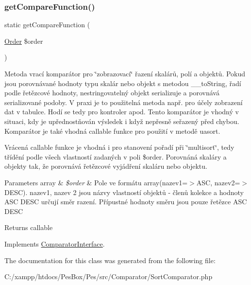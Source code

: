 \subsubsection{\texorpdfstring{get\+Compare\+Function()}{getCompareFunction()}}
{\footnotesize\ttfamily static get\+Compare\+Function (\begin{DoxyParamCaption}\item[{\mbox{\hyperlink{class_pes_1_1_query_1_1_order}{Order}}}]{\$order }\end{DoxyParamCaption})\hspace{0.3cm}{\ttfamily [static]}}

Metoda vrací komparátor pro \char`\"{}zobrazovací\char`\"{} řazení skalárů, polí a objektů. Pokud jsou porovnávané hodnoty typu skalár nebo objekt s metodou \+\_\+\+\_\+to\+String, řadí podle řetězcové hodnoty, nestringovatelný objekt serializuje a porovnává serializované podoby. V praxi je to použitelná metoda např. pro účely zobrazení dat v tabulce. Hodí se tedy pro kontroler apod. Tento komparátor je vhodný v situaci, kdy je upřednostňován výsledek i když nepřesně seřazený před chybou. Komparátor je také vhodná callable funkce pro použití v metodě uasort.

Vrácená callable funkce je vhodná i pro stanovení pořadí při \char`\"{}multisort\char`\"{}, tedy třídění podle všech vlastností zadaných v poli \$order. Porovnáná skaláry a objekty tak, že porovnává řetězcové vyjádření skaláru nebo objektu.


\begin{DoxyParams}[1]{Parameters}
array & {\em \$order} & Pole ve formátu array(\textquotesingle{}nazev1\textquotesingle{}=$>$\textquotesingle{}A\+SC\textquotesingle{}, \textquotesingle{}nazev2=$>$\textquotesingle{}D\+E\+SC\textquotesingle{}). nazev1, nazev 2 jsou názvy vlastností objektů -\/ členů kolekce a hodnoty \textquotesingle{}A\+SC\textquotesingle{} \textquotesingle{}D\+E\+SC\textquotesingle{} určují směr razení. Přípustné hodnoty směru jsou pouze řetězce \textquotesingle{}A\+SC\textquotesingle{} \textquotesingle{}D\+E\+SC\textquotesingle{} \\
\hline
\end{DoxyParams}
\begin{DoxyReturn}{Returns}
callable 
\end{DoxyReturn}


Implements \mbox{\hyperlink{interface_pes_1_1_comparator_1_1_comparator_interface_a21aeb75d37fce6724b5a60f836dfc85c}{Comparator\+Interface}}.



The documentation for this class was generated from the following file\+:\begin{DoxyCompactItemize}
\item 
C\+:/xampp/htdocs/\+Pes\+Box/\+Pes/src/\+Comparator/Sort\+Comparator.\+php\end{DoxyCompactItemize}
